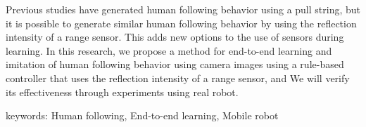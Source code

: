   Previous studies have generated human following behavior using a pull string, but it is possible to generate similar human following behavior by using the reflection intensity of a range sensor. This adds new options to the use of sensors during learning. In this research, we propose a method for end-to-end learning and imitation of human following behavior using camera images using a rule-based controller that uses the reflection intensity of a range sensor, and We will verify its effectiveness through experiments using real robot.

  \vspace{1.5zh}

  keywords: Human following, End-to-end learning, Mobile robot
